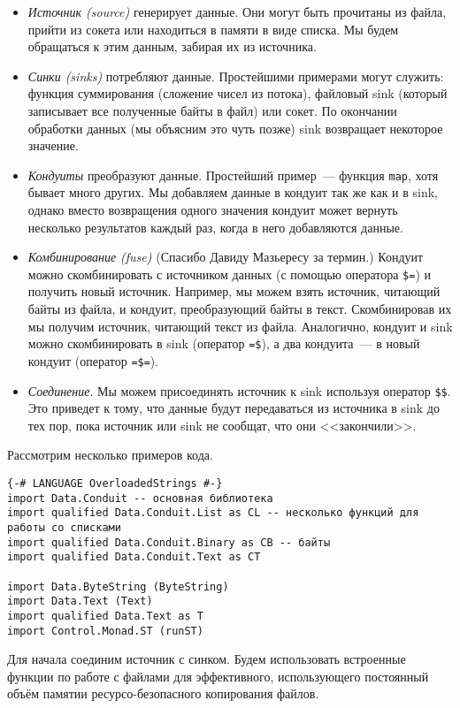 \begin{itemize}
 \item \emph{Источник (source)} генерирует данные. Они могут быть прочитаны из файла, прийти из
сокета или находиться в памяти в виде списка. Мы будем обращаться к этим данным, забирая их из
источника.
 \item \emph{Синки (sinks)} потребляют данные. 
 Простейшими примерами могут служить: функция суммирования (сложение чисел из потока), файловый sink (который записывает все полученные байты в файл) или сокет.
По окончании обработки данных (мы объясним это чуть позже) sink возвращает некоторое значение.
 \item \emph{Кондуиты} преобразуют данные. Простейший пример~--- функция
\lstinline=map=,
хотя бывает много других. Мы добавляем данные в кондуит так же как и в sink, однако вместо
возвращения одного значения кондуит может вернуть несколько результатов каждый раз,
когда в него добавляются данные.
  \item \emph{Комбинирование (fuse)} (Спасибо Давиду Мазьересу за термин.) Кондуит можно 
скомбинировать с источником данных (с помощью оператора \lstinline#$=#) и получить
новый источник. Например, мы можем взять источник, читающий байты из файла, и
кондуит, преобразующий байты в текст. Скомбинировав их мы получим 
источник, читающий текст из файла. Аналогично, кондуит и sink можно скомбинировать в sink
(оператор \verb#=$#), а два кондуита~--- в новый кондуит (оператор \verb#=$=#).
  \item \emph{Соединение}. Мы можем присоединять источник к sink используя оператор
\verb=$$=.
Это приведет к тому, что данные будут передаваться из источника в sink до тех пор, пока
источник или sink не сообщат, что они <<закончили>>.
\end{itemize}

Рассмотрим несколько примеров кода.
\begin{lstlisting}
{-# LANGUAGE OverloadedStrings #-}
import Data.Conduit -- основная библиотека
import qualified Data.Conduit.List as CL -- несколько функций для работы со списками
import qualified Data.Conduit.Binary as CB -- байты
import qualified Data.Conduit.Text as CT

import Data.ByteString (ByteString)
import Data.Text (Text)
import qualified Data.Text as T
import Control.Monad.ST (runST)
\end{lstlisting}
Для начала соединим источник с синком. Будем использовать встроенные 
функции по работе с файлами для эффективного, использующего постоянный объём памятии ресурсо-безопасного копирования файлов.

